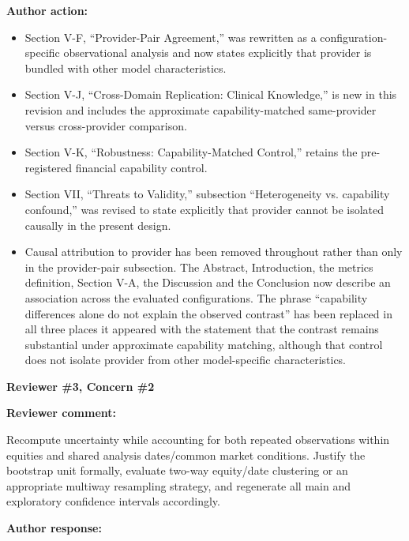 \documentclass[11pt]{article}
\newcommand{\rvcomment}[1]{{\color{ReviewerGreen}#1}}
\newcommand{\concern}[1]{\textbf{\color{ReviewerGreen}#1}}
\begin{document}
\textbf{Author action:}

\begin{itemize}

\item Section V-F, ``Provider-Pair Agreement,'' was rewritten as a configuration-specific observational analysis and now states explicitly that provider is bundled with other model characteristics.

\item Section V-J, ``Cross-Domain Replication: Clinical Knowledge,'' is new in this revision and includes the approximate capability-matched same-provider versus cross-provider comparison.

\item Section V-K, ``Robustness: Capability-Matched Control,'' retains the pre-registered financial capability control.

\item Section VII, ``Threats to Validity,'' subsection ``Heterogeneity vs. capability confound,'' was revised to state explicitly that provider cannot be isolated causally in the present design.

\item Causal attribution to provider has been removed throughout rather than only in the provider-pair subsection. The Abstract, Introduction, the metrics definition, Section V-A, the Discussion and the Conclusion now describe an association across the evaluated configurations. The phrase ``capability differences alone do not explain the observed contrast'' has been replaced in all three places it appeared with the statement that the contrast remains substantial under approximate capability matching, although that control does not isolate provider from other model-specific characteristics.

\end{itemize}

\vspace{12pt}
\concern{Reviewer \#3, Concern \#2}

\concern{Reviewer comment:}

\rvcomment{Recompute uncertainty while accounting for both repeated observations within equities and shared analysis dates/common market conditions. Justify the bootstrap unit formally, evaluate two-way equity/date clustering or an appropriate multiway resampling strategy, and regenerate all main and exploratory confidence intervals accordingly.}

\textbf{Author response:}
\end{document}
